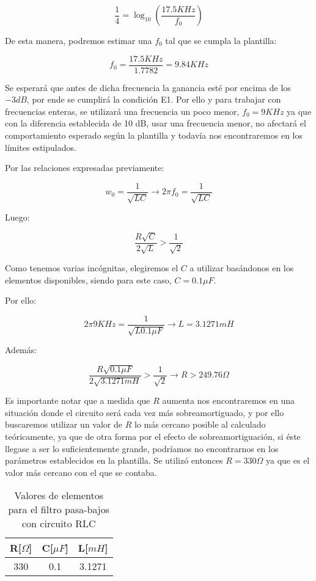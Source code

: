 $$\frac{1}{4}=\log_{10}(\frac{17.5KHz}{f_0})$$

De esta manera, podremos estimar una $f_0$ tal que se cumpla la plantilla:

$$f_0 = \frac{17.5KHz}{1.7782} = 9.84 KHz$$

Se esperará que antes de dicha frecuencia la ganancia esté por encima de los $-3dB$, por ende se cumplirá la condición E1. 
Por ello y para trabajar con frecuencias enteras, se utilizará una frecuencia un poco menor, $f_0=9 KHz$ ya que con la diferencia establecida de 10 dB, 
usar una frecuencia menor, no afectará el comportamiento esperado según la plantilla y todavía nos encontraremos en los límites estipulados.

Por las relaciones expresadas previamente:

$$w_0=\frac{1}{\sqrt{LC}} \longrightarrow 2\pi f_0=\frac{1}{\sqrt{LC}}$$

Luego:

$$\frac{R\sqrt{C}}{2\sqrt{L}} > \frac{1}{\sqrt{2}}$$

Como tenemos varias incógnitas, elegiremos el $C$ a utilizar basándonos en los elementos disponibles, siendo para este caso,
$C=0.1\mu F$.

Por ello:

$$2\pi 9KHz=\frac{1}{\sqrt{L0.1 \mu F}} \longrightarrow L = 3.1271 mH$$

Además:

$$\frac{R\sqrt{0.1\mu F}}{2\sqrt{3.1271mH}} > \frac{1}{\sqrt{2}} \longrightarrow R > 249.76 \Omega $$

Es importante notar que a medida que $R$ aumenta nos encontraremos en una situación donde el circuito será
cada vez más sobreamortiguado, y por ello buscaremos utilizar un valor de $R$ lo más cercano posible al calculado teóricamente, ya que de otra forma
por el efecto de sobreamortiguación, si éste llegase a ser lo suficientemente grande,
podríamos no encontrarnos en los parámetros establecidos en la plantilla. 
Se utilizó entonces $R= 330 \Omega$ ya que es el valor más cercano con el que se contaba.


\begin{table}[H]
    \centering
    \begin{tabular}{|c|c|c|}
    \hline
    \rowcolor[HTML]{C0C0C0} 
    R[$\Omega$] & C[$\mu F$] & L[$mH$]  \\ \hline
    330      & 0.1  & 3.1271 \\ \hline
    \end{tabular}
    \caption{Valores de elementos para el filtro pasa-bajos con circuito RLC}
    \end{table}

